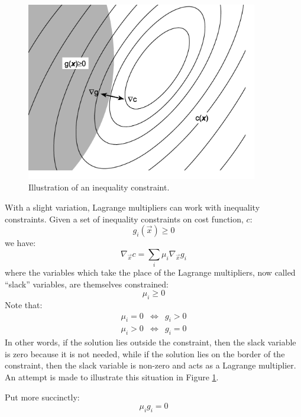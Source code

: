 \documentclass{article}
\newcommand{\cost}{c}
\newcommand{\ineqfn}{g}
\newcommand{\coord}{x}
\newcommand{\slack}{\mu}
\begin{document}
\begin{figure}
	\includegraphics[width=0.9\textwidth]{inequality.eps}
	\caption{Illustration of an inequality constraint.}\label{ineq_fig}
\end{figure}

With a slight variation, Lagrange multipliers can work with inequality
constraints.
Given a set of inequality constraints on cost function, $\cost$:
\begin{equation}
	\ineqfn_i(\vec \coord) \ge 0
 	\label{inequality2}
\end{equation}
we have:
\begin{equation}
	\nabla_{\vec \coord} \cost = \sum_i \slack_i \nabla_{\vec \coord} \ineqfn_i
\end{equation}
where the variables which take the place of the Lagrange multipliers,
now called ``slack'' variables, are themselves constrained:
\begin{equation}
	\slack_i \ge 0
\end{equation}
Note that:
\begin{eqnarray}
\slack_i = 0 & \iff & \ineqfn_i > 0 \\
	\slack_i > 0 & \iff & \ineqfn_i = 0
\end{eqnarray}
In other words, if the solution lies outside the constraint, then the slack
variable is zero because it is not needed, 
while if the solution lies on the border of the constraint,
then the slack variable is non-zero and acts as a Lagrange multiplier.
An attempt is made to illustrate this situation in Figure \ref{ineq_fig}.

Put more succinctly:
\begin{equation}
	\slack_i \ineqfn_i = 0
\end{equation}



\end{document}
